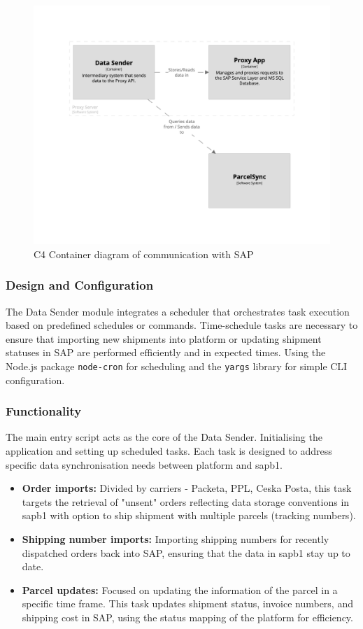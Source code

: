 \begin{figure}[H]\centering
\includegraphics[width=140mm]{img/chap07/fig_data_sender.png}
\caption{C4 Container diagram of communication with SAP}
\label{img07:structurizr:data_sender}
\end{figure}


\subsubsection{Design and Configuration}
The Data Sender module integrates a scheduler that orchestrates task execution based on predefined schedules or commands.
Time-schedule tasks are necessary to ensure that importing new shipments into platform or updating shipment statuses in SAP are performed efficiently and in expected times.
Using the Node.js package \texttt{node-cron} for scheduling and the \texttt{yargs} library for simple CLI configuration.

\subsubsection{Functionality}
The main entry script acts as the core of the Data Sender.
Initialising the application and setting up scheduled tasks.
Each task is designed to address specific data synchronisation needs between platform and \gls{sapb1}.
\begin{itemize}
    \item \textbf{Order imports:} Divided by carriers - Packeta, PPL, Ceska Posta, this task targets the retrieval of "unsent" orders reflecting data storage conventions in \gls{sapb1} with option to ship shipment with multiple parcels (tracking numbers).
    \item \textbf{Shipping number imports:} Importing shipping numbers for recently dispatched orders back into SAP, ensuring that the data in \gls{sapb1} stay up to date.
    \item \textbf{Parcel updates:} Focused on updating the information of the parcel in a specific time frame. This task updates shipment status, invoice numbers, and shipping cost in SAP, using the status mapping of the platform for efficiency.
\end{itemize}

